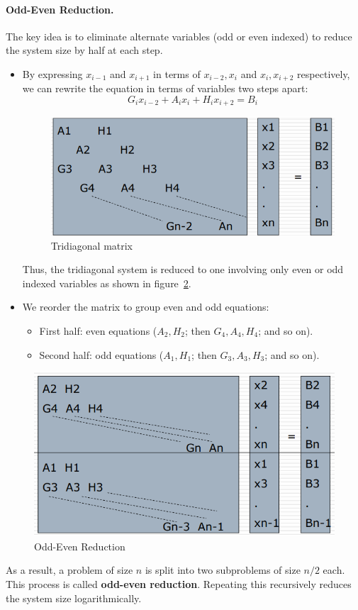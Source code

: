 \documentclass[12pt]{book}
\begin{document}
\paragraph{Odd-Even Reduction.}
The key idea is to eliminate alternate variables (odd or even indexed) to reduce the system size by half at each step.
\begin{itemize}
    \item By expressing $x_{i-1}$ and $x_{i+1}$ in terms of $x_{i-2},x_i$ and $x_i,x_{i+2}$ respectively, we can rewrite the equation in terms of variables two steps apart:
\[
G_i x_{i-2} + A_i x_i + H_i x_{i+2} = B_i
\]
\begin{figure}[ht]
    \centering
    \includegraphics[width=0.5\linewidth]{images/tridiagexamplemat.png}
    \caption{Tridiagonal matrix}
    \label{fig:tridiagexampmat}
\end{figure}
Thus, the tridiagonal system is reduced to one involving only even or odd indexed variables as shown in figure~\ref{fig:oddevenred}.
\item We reorder the matrix to group even and odd equations:
  \begin{itemize}
      \item First half: even equations ($A_2, H_2$; then $G_4, A_4, H_4$; and so on).
      \item Second half: odd equations ($A_1, H_1$; then $G_3, A_3, H_3$; and so on).
  \end{itemize}

\end{itemize}
\begin{figure}[ht]
    \centering
    \includegraphics[width=0.5\linewidth]{images/tridiagexamp.png}
    \caption{Odd-Even Reduction}
    \label{fig:oddevenred}
\end{figure}
As a result, a problem of size $n$ is split into two subproblems of size $n/2$ each. This process is called \textbf{odd-even reduction}. Repeating this recursively reduces the system size logarithmically.
\end{document}
